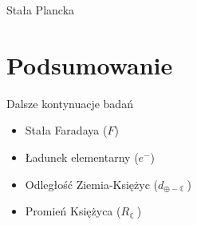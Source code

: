 \documentclass{beamer}
\begin{document}
\begin{frame}{Stała Plancka}

\end{frame}


\section{Podsumowanie}

\begin{frame}{Dalsze kontynuacje badań}
\begin{itemize}
\item Stała Faradaya ($F$)
\item Ładunek elementarny ($e^-$)
\item Odległość Ziemia-Księżyc ($d_{\oplus - \leftmoon}$)
\item Promień Księżyca ($R_{\leftmoon}$)
\end{itemize}

\end{frame}
\end{document}
